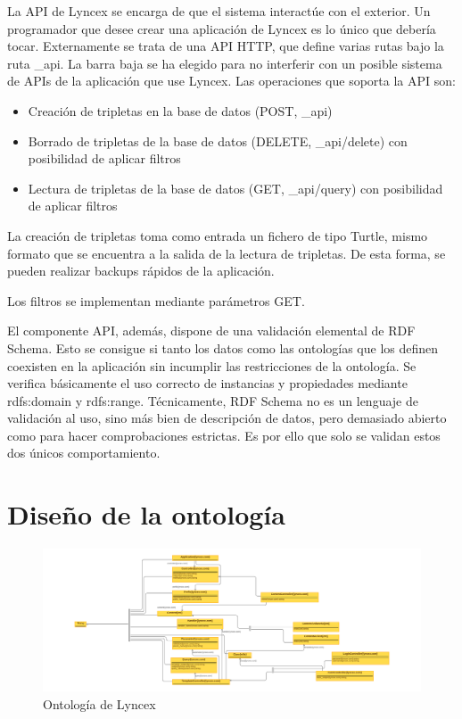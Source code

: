 \documentclass[openright,twoside,12pt]{book}
\begin{document}
La API de Lyncex se encarga de que el sistema interactúe con el exterior.
Un programador que desee crear una aplicación de Lyncex es lo único que debería tocar.
Externamente se trata de una API HTTP, que define varias rutas bajo la ruta \_api. La barra baja se ha elegido para no interferir con un posible sistema de APIs de la aplicación que use Lyncex.
Las operaciones que soporta la API son:
\begin{itemize}
    \item Creación de tripletas en la base de datos (POST, \_api)
    \item Borrado de tripletas de la base de datos (DELETE, \_api/delete) con posibilidad de aplicar filtros
    \item Lectura de tripletas de la base de datos (GET, \_api/query) con posibilidad de aplicar filtros
\end{itemize}

La creación de tripletas toma como entrada un fichero de tipo Turtle, mismo formato que se encuentra a la salida de la lectura de tripletas.
De esta forma, se pueden realizar backups rápidos de la aplicación.

Los filtros se implementan mediante parámetros GET.

El componente API, además, dispone de una validación elemental de RDF Schema.
Esto se consigue si tanto los datos como las ontologías que los definen coexisten en la aplicación sin incumplir las restricciones de la ontología.
Se verifica básicamente el uso correcto de instancias y propiedades mediante rdfs:domain y rdfs:range.
Técnicamente, RDF Schema no es un lenguaje de validación al uso, sino más bien de descripción de datos, pero demasiado abierto como para hacer comprobaciones estrictas.
Es por ello que solo se validan estos dos únicos comportamiento.

\section{Diseño de la ontología}

\begin{figure}
    \centering
    \includegraphics[width=\textwidth]{lyncex.png}
    \caption{Ontología de Lyncex}
    \label{fig:ontologia}
\end{figure}
\end{document}
